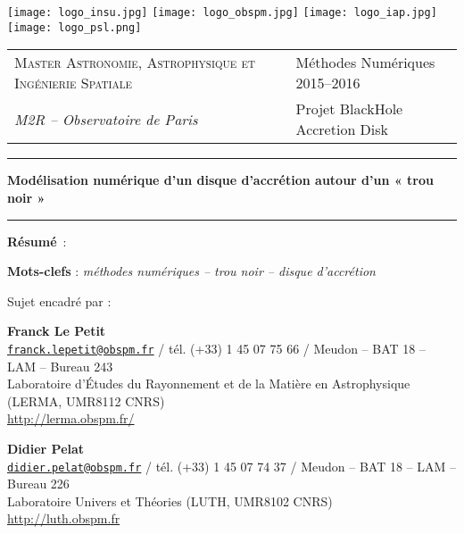 \thispagestyle{empty}

\texttt{[image: logo\_insu.jpg]} \hfill
\texttt{[image: logo\_obspm.jpg]} \hfill
\texttt{[image: logo\_iap.jpg]} \hfill
\texttt{[image: logo\_psl.png]}
 
\vspace{0.5cm}

\begin{tabularx}{\textwidth}{@{} l X l @{}}
\textsc{Master Astronomie, Astrophysique et Ingénierie Spatiale} & & Méthodes Numériques 2015–2016 \\
\textit{M2R – Observatoire de Paris} & & Projet BlackHole Accretion Disk
\end{tabularx}
 
\begin{center}
 
\vspace{1.5cm}
 
\rule[11pt]{5cm}{0.5pt}
 
\textbf{\huge Modélisation numérique d’un disque d’accrétion autour d’un « trou noir »}

\rule{5cm}{0.5pt}

\vspace{1.5cm}

\parbox{15cm}{\textbf{Résumé} : 
} %

\vspace{0.5cm}

\parbox{15cm}{
\textbf{Mots-clefs} : \it méthodes numériques – trou noir – disque d’accrétion
} %

\vspace{0.5cm}

\parbox{15cm}{
Sujet encadré par :

\textbf{Franck Le Petit} \\
\href{mailto:franck.lepetit@obspm.fr}
{\tt franck.lepetit@obspm.fr} / tél. (+33) 1 45 07 75 66 / Meudon – BAT 18 – LAM – Bureau 243 \\
Laboratoire d’Études du Rayonnement et de la Matière en Astrophysique (LERMA, UMR8112 CNRS) \\
\url{http://lerma.obspm.fr/}

\textbf{Didier Pelat} \\
\href{mailto:didier.pelat@obspm.fr}
{\tt didier.pelat@obspm.fr} / tél. (+33) 1 45 07 74 37 / Meudon – BAT 18 – LAM – Bureau 226 \\
Laboratoire Univers et Théories (LUTH, UMR8102 CNRS) \\
\url{http://luth.obspm.fr}

}
\end{center}

